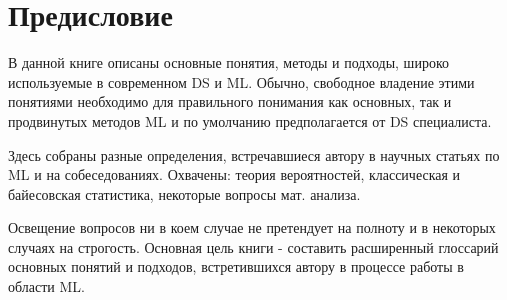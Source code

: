 \chapter*{Предисловие}

В данной книге описаны основные понятия, методы и подходы, широко используемые в современном DS и ML. Обычно, свободное владение этими понятиями необходимо для правильного понимания как основных, так и продвинутых методов ML и по умолчанию предполагается от DS специалиста.

Здесь собраны разные определения, встречавшиеся автору в научных статьях по ML и на собеседованиях. Охвачены: теория вероятностей, классическая и байесовская статистика, некоторые вопросы мат. анализа.

Освещение вопросов ни в коем случае не претендует на полноту и в некоторых случаях на строгость. Основная цель книги - составить расширенный глоссарий основных понятий и подходов, встретившихся автору в процессе работы в области ML.

